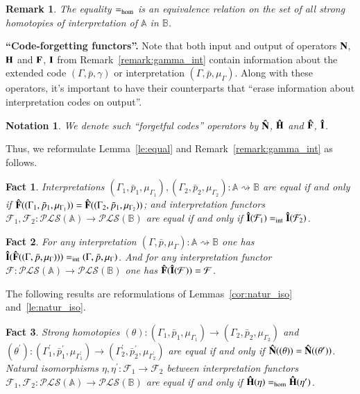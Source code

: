 \documentclass[12pt]{article}
\newtheorem{fact}{Fact}
\newtheorem{remark}{Remark}
\newtheorem{notation}{Notation}
\theoremstyle{definition}
\def\MA{{\mathbb{A}}}
\def\MB{{\mathbb{B}}}
\def\F{{\mathcal{F}}}
\def\PLS{{\mathcal{PLS}}}
\begin{document}
\begin{remark}
The equality $=_{\rm hom}$ is an equivalence relation on the set of all strong homotopies of interpretation of $\MA$ in $\MB$.
\end{remark}

{\bf ``Code-forgetting functors''.} Note that both input and output of operators ${\bf N}$, ${\bf H}$ and ${\bf F}$, ${\bf I}$ from Remark~\ref{remark:gamma_int}   contain information about the extended code $(\Gamma,\bar p,\gamma)$ or interpretation $(\Gamma,\bar p,\mu_\Gamma)$. Along with these operators, it's important to have their counterparts that ``erase information about interpretation codes on output''.

\begin{notation}\label{hat}
We denote such ``forgetful codes'' operators by ${\bf \hat N}$, ${\bf \hat H}$ and ${\bf \hat F}$, ${\bf \hat I}$.
\end{notation}

Thus, we reformulate Lemma~\ref{le:equal} and Remark~\ref{remark:gamma_int} as follows.

\begin{fact}\label{fact:hat1}
 Interpretations $(\Gamma_1,\bar p_1,\mu_{\Gamma_1}),(\Gamma_2,\bar p_2,\mu_{\Gamma_2})\colon \MA\rightsquigarrow\MB$ are equal if and only if ${\bf \hat F}((\Gamma_1,\bar p_1,\mu_{\Gamma_1}))={\bf \hat F}((\Gamma_2,\bar p_1,\mu_{\Gamma_2}))$; and interpretation functors $\F_1,\F_2\colon \PLS(\MA)\to\PLS(\MB)$ are equal if and only if ${\bf \hat I}(\F_1)=_{\rm int}{\bf \hat I}(\F_2)$. \end{fact}

 \begin{fact}\label{fact:hat2}
For any interpretation $(\Gamma,\bar p,\mu_\Gamma)\colon \MA\rightsquigarrow\MB$ one has ${\bf \hat I}({\bf \hat F}((\Gamma,\bar p,\mu_\Gamma)))=_{\rm int}(\Gamma,\bar p,\mu_\Gamma)$. And for any interpretation functor $\F\colon \PLS(\MA)\to \PLS(\MB)$ one has ${\bf \hat F}({\bf \hat I}(\F))=\F$.
\end{fact}

The following results are reformulations of Lemmas~\ref{cor:natur_iso} and~\ref{le:natur_iso}.

\begin{fact}\label{fact:hat3}
Strong homotopies $(\theta)\colon (\Gamma_1,\bar p_1,\mu_{\Gamma_1})\to (\Gamma_2,\bar p_2,\mu_{\Gamma_2})$ and $(\theta^\prime)\colon (\Gamma^\prime_1,\bar p^\prime_1,\mu_{\Gamma^\prime_1})\to (\Gamma^\prime_2,\bar p^\prime_2,\mu_{\Gamma^\prime_2})$ are equal if and only if ${\bf \hat N}((\theta))={\bf \hat N}((\theta^\prime))$. Natural isomorphisms $\eta,\eta^\prime\colon \F_1\to\F_2$ between interpretation functors $\F_1,\F_2\colon \PLS(\MA)\to \PLS(\MB)$ are equal if and only if ${\bf \hat H}(\eta)=_{\rm hom}{\bf \hat H}(\eta^\prime)$.
\end{fact}
\end{document}
